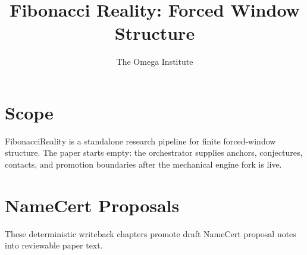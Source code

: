\documentclass[11pt]{article}
\title{Fibonacci Reality: Forced Window Structure}
\author{The Omega Institute}
\date{}
\begin{document}
\maketitle

\section{Scope}
FibonacciReality is a standalone research pipeline for finite forced-window structure. The paper starts empty: the orchestrator supplies anchors, conjectures, contacts, and promotion boundaries after the mechanical engine fork is live.



\section{NameCert Proposals}
These deterministic writeback chapters promote draft NameCert proposal notes into reviewable paper text.




























\end{document}
